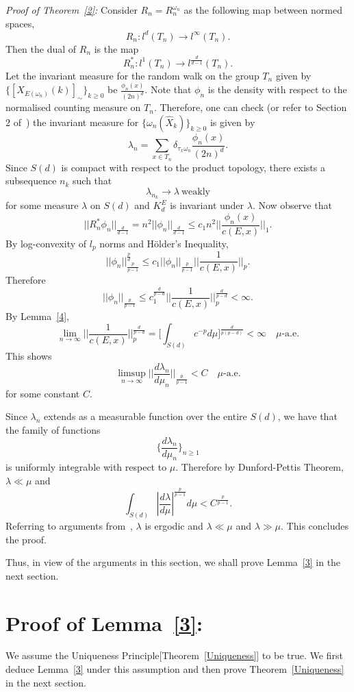 \documentclass[final]{aomart}
\def\mathscr#1{#1}%
\theoremstyle{plain}
\theoremstyle{definition}
\theoremstyle{remark}
\begin{document}
\textit{Proof of Theorem~\ref{2}:} Consider $R_n=R^{\omega_n}_n $ as the following map between normed spaces, \[
R_n: l^d(T_n) \to l^{\infty}(T_n).
\]
Then the dual of $R_n $ is the map\[
R^*_n:l^1 (T_n) \to l^{\frac{d}{d-1}}(T_n).   
\]
Let the invariant measure for the random walk on the group $T_n$ given by $\{[X_{\mathscr{E}(\omega_n)}(k)]_\sim\}_{k \geq 0}$ be $\frac{\phi_n(x)}{(2n)^d}$. Note that $\phi_n $ is the density with respect to the normalised counting measure on $T_n$. Therefore, one can check (or refer to Section 2 of~\cite{guo2012quenched}) the invariant measure for $\{\omega_n(\hat{X}_k)\}_{k \geq 0}$ is given by \[
\lambda_n = \sum_{ x \in T_n} \delta_{\tau_x\omega_n} \frac{\phi
_n(x)}{(2n)^d}. 
\]
Since $\mathscr{S}(d)$ is compact with respect to the product topology, there exists a subsequence $n_k$ such that \[
\lambda_{n_k} \to \lambda~\text{weakly}
\]
for some measure $\lambda$ on $\mathscr{S}(d)$ and $K^{\mathscr{E}}_d$ is invariant under $\lambda$.
Now observe that \[
||R^*_n \phi_n||_{\frac{d}{d-1}}= n^2||\phi_n||_{\frac{d}{d-1}} \leq c_1n^2||\frac{\phi_n(x)}{c(\mathscr{E},x)}||_{1} .
\] By log-convexity of $l_p$ norms and Hölder's Inequality, 
\[
||\phi_n||_{\frac{p}{p-1}}^\frac{p}{d} \leq c_1||\phi_n||_{\frac{p}{p-1}}|| \frac{1}{c(\mathscr{E},x)}||_p.
\]
Therefore
\[
||\phi_n||_{\frac{p}{p-1}} \leq c_1^{\frac{d}{p-d}} || \frac{1}{c(\mathscr{E},x)}||_p^{\frac{d}{p-d}} < \infty.
\]
By Lemma~\ref{4}, \[
\lim_{n \to \infty} || \frac{1}{c(\mathscr{E},x)}||_p^{\frac{d}{p-d}} =\Big [ \int_{\mathscr{S}(d)} c^{-p} d\mu \Big] ^{\frac{d}{p(p-d)}} <\infty \quad \mu\text{-a.e.}
\]
This shows \[
\limsup_{n \to \infty}||\frac{d\lambda_n}{d\mu_n}||_{\frac{p}{p-1}} < C \quad \mu\text{-a.e.}
\]
for some constant $C$. 

Since $\lambda_n$ extends as a measurable function over the entire $\mathscr{S}(d)$, we have that the family of functions \[
\big\{\frac{d\lambda_n}{d\mu_n}\big\}_{n \geq 1}
\]
is uniformly integrable with respect to $\mu$. Therefore by Dunford-Pettis Theorem, $\lambda\ll \mu$ and \[
\int_{\mathscr{S}(d)} |\frac{d\lambda}{d\mu}|^\frac{p}{p-1} d\mu < C^{\frac{p}{p-1}}.
\] 
Referring to arguments from~\cite{BolthausenSznitman2002}, $\lambda$ is ergodic and $\lambda\ll \mu$ and $\lambda\gg\mu$. This concludes the proof.

Thus, in view of the arguments in this section, we shall prove Lemma~\ref{3} in the next section. 
\section{Proof of Lemma~\ref{3}:}
We assume the Uniqueness Principle[Theorem~\ref{Uniqueness}] to be true. We first deduce Lemma~\ref{3} under this assumption and then prove Theorem~\ref{Uniqueness} in the next section.
\end{document}
